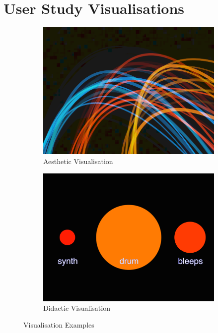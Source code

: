 \chapter{User Study Visualisations}

\begin{figure}[H]
\centering
\begin{subfigure}{.5\textwidth}
    \centering
    \includegraphics[width=0.9\linewidth]{../study-2/results/visualisations/aesthetic-vis.png}
    \caption{Aesthetic Visualisation}
    \label{avis}
\end{subfigure}%
\begin{subfigure}{.5\textwidth}
    \centering
    \includegraphics[width=0.9\linewidth]{../study-2/results/visualisations/didactic-vis.png}
    \caption{Didactic Visualisation}
    \label{dvis}
\end{subfigure}
\caption{Visualisation Examples}
\end{figure}

